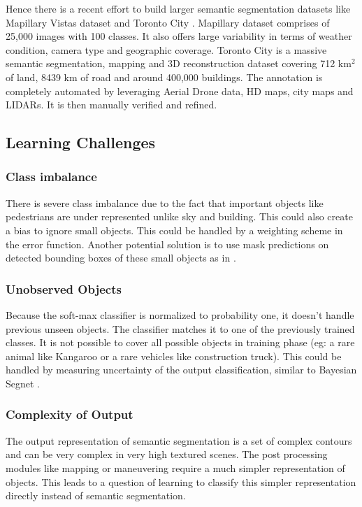 \documentclass[conference]{IEEEtran}
\begin{document}
Hence there is a recent effort to build larger semantic segmentation datasets like Mapillary Vistas dataset \cite{mapillary} and Toronto City \cite{wang2016torontocity}. Mapillary dataset comprises of 25,000 images with 100 classes. It also offers large variability in terms of weather condition, camera type and geographic coverage. Toronto City is a massive semantic segmentation, mapping and 3D reconstruction dataset covering 712 km$^{2}$ of land, 8439 km of road and around 400,000 buildings. The annotation is completely automated by leveraging Aerial Drone data, HD maps, city maps and LIDARs. It is then manually verified and refined. 

\subsection{Learning Challenges}\subsubsection{\textbf{Class imbalance}} There is severe class imbalance due to the fact that important objects like pedestrians are under represented unlike sky and building. This could also create a bias to ignore small objects. This could be handled by a weighting scheme in the error function. Another potential solution is to use mask predictions on detected bounding boxes of these small objects as in \cite{DBLP:journals/corr/DaiHLRS16}\cite{teichmann2016multinet}. 

\subsubsection{\textbf{Unobserved Objects}} Because the soft-max classifier is normalized to probability one, it doesn't handle previous unseen objects. The classifier matches it to one of the previously trained classes. It is not possible to cover all possible objects in training phase (eg: a rare animal like Kangaroo or a rare vehicles like construction truck). This could be handled by measuring uncertainty of the output classification, similar to Bayesian Segnet \cite{DBLP:journals/corr/KendallBC15}.  

\subsubsection{\textbf{Complexity of Output}} The output representation of semantic segmentation is a set of complex contours and can be very complex in very high textured scenes. The post processing modules like mapping or maneuvering require a much simpler representation of objects. This leads to a question of learning to classify this simpler representation directly instead of semantic segmentation.
\end{document}
